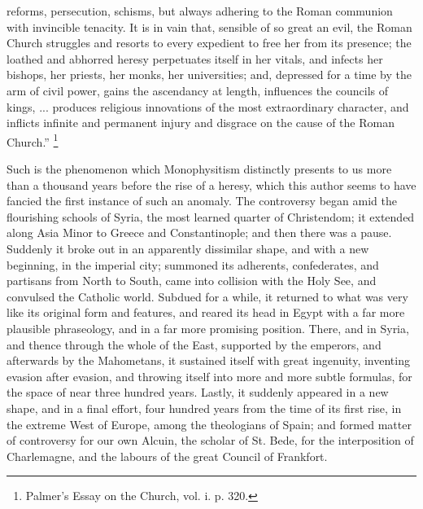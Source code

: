 reforms, persecution, schisms, but always adhering to the Roman
communion with invincible tenacity. It is in vain that, sensible of so
great an evil, the Roman Church struggles and resorts to every
expedient to free her from its presence; the loathed and abhorred
heresy perpetuates itself in her vitals, and infects her bishops, her
priests, her monks, her universities; and, depressed for a time by the
arm of civil power, gains the ascendancy at length, influences the
councils of kings, ... produces religious innovations of the most
extraordinary character, and inflicts infinite and permanent injury
and disgrace on the cause of the Roman Church.'' \footnote{Palmer's Essay on the Church, vol. i. p.
320.}

Such is the phenomenon which Monophysitism distinctly presents to
us more than a thousand years before the rise of a heresy, which this
author seems to have fancied the first instance of such an anomaly.
The controversy began amid the flourishing schools of Syria, the most
learned quarter of Christendom; it extended along Asia Minor to Greece
and Constantinople; and then there was a pause. Suddenly it broke out
in an apparently dissimilar shape, and with a new beginning, in the
imperial city; summoned its adherents, confederates, and partisans
from North to South, came into collision with the Holy See, and
convulsed the Catholic world. Subdued for a while, it returned to what
was very like its original form and features, and reared its head in
Egypt with a far more plausible phraseology, and in a far more
promising position. There, and in Syria, and thence through the whole
of the East, supported by the emperors, and afterwards by the
Mahometans, it sustained itself with great ingenuity, inventing
evasion after evasion, and throwing itself into more and more subtle
formulas, for the space of near three hundred years. Lastly, it
suddenly appeared in a new shape, and in a final effort, four hundred
years from the time of its first rise, in the extreme West of Europe,
among the theologians of Spain; and formed matter of controversy for
our own Alcuin, the scholar of St. Bede, for the interposition of
Charlemagne, and the labours of the great Council of Frankfort.

